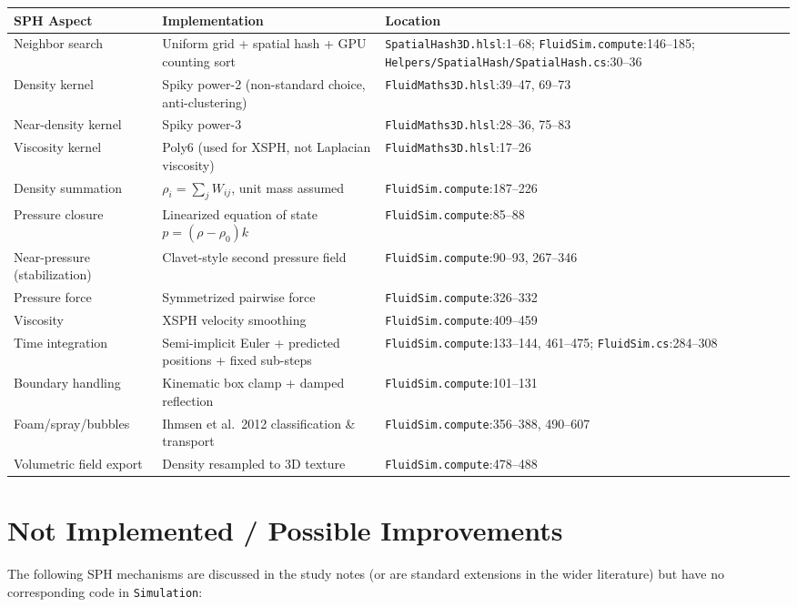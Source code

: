\documentclass[11pt]{article}
\newcommand{\file}[1]{\texttt{#1}}
\begin{document}
\begin{longtable}{@{}p{3.6cm}p{5.6cm}p{5.8cm}@{}}
\toprule
\textbf{SPH Aspect} & \textbf{Implementation} & \textbf{Location} \\
\midrule\endhead
Neighbor search & Uniform grid + spatial hash + GPU counting sort & \file{SpatialHash3D.hlsl}:1--68; \file{FluidSim.compute}:146--185; \file{Helpers/SpatialHash/SpatialHash.cs}:30--36 \\
Density kernel & Spiky power-2 (non-standard choice, anti-clustering) & \file{FluidMaths3D.hlsl}:39--47, 69--73 \\
Near-density kernel & Spiky power-3 & \file{FluidMaths3D.hlsl}:28--36, 75--83 \\
Viscosity kernel & Poly6 (used for XSPH, not Laplacian viscosity) & \file{FluidMaths3D.hlsl}:17--26 \\
Density summation & $\rho_i=\sum_j W_{ij}$, unit mass assumed & \file{FluidSim.compute}:187--226 \\
Pressure closure & Linearized equation of state $p=(\rho-\rho_0)k$ & \file{FluidSim.compute}:85--88 \\
Near-pressure (stabilization) & Clavet-style second pressure field & \file{FluidSim.compute}:90--93, 267--346 \\
Pressure force & Symmetrized pairwise force & \file{FluidSim.compute}:326--332 \\
Viscosity & XSPH velocity smoothing & \file{FluidSim.compute}:409--459 \\
Time integration & Semi-implicit Euler + predicted positions + fixed sub-steps & \file{FluidSim.compute}:133--144, 461--475; \file{FluidSim.cs}:284--308 \\
Boundary handling & Kinematic box clamp + damped reflection & \file{FluidSim.compute}:101--131 \\
Foam/spray/bubbles & Ihmsen et al.\ 2012 classification \& transport & \file{FluidSim.compute}:356--388, 490--607 \\
Volumetric field export & Density resampled to 3D texture & \file{FluidSim.compute}:478--488 \\
\bottomrule
\end{longtable}

\section{Not Implemented / Possible Improvements}
\label{sec:notimplemented}

The following SPH mechanisms are discussed in the study notes (or are
standard extensions in the wider literature) but have no corresponding code
in \texttt{Simulation}:
\end{document}

